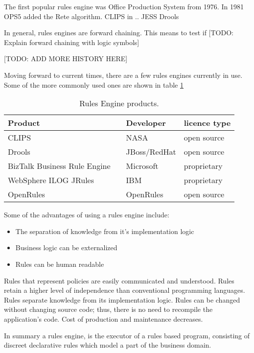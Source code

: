 The first popular rules engine was Office Production System from 1976. 
In 1981 OPS5 added the Rete algorithm.
CLIPS in  ..
JESS
Drools 



In general, rules engines are forward chaining.  This means to test if 
[TODO: Explain forward chaining with logic symbols] 

[TODO: ADD MORE HISTORY HERE]

Moving forward to current times, there are a few rules engines currently in use.
Some of the more commonly used ones are shown in table \ref{table:RuleEngines}

\begin{table}
    \begin{center}
        \begin{tabular}{ |l c |l|l| } 
            \hline
            Product                      &                             & Developer    & licence type   \\
            \hline
            CLIPS                        & \cite{CLIPSProductPage}     & NASA         & open source    \\ 
            Drools                       & \cite{DroolsProductPage}    & JBoss/RedHat & open source    \\ 
            BizTalk Business Rule Engine & \cite{BiztalkProductPage}   & Microsoft    & proprietary    \\ 
            WebSphere ILOG JRules        & \cite{JRulesProductPage}    & IBM          & proprietary    \\ 
            OpenRules                    & \cite{OpenRulesProductPage} & OpenRules    & open source    \\ 
            \hline
        \end{tabular}
    \end{center}
    \caption{Rules Engine products.}
    \label{table:RuleEngines}
\end{table}

Some of the advantages of using a rules engine include:
\begin{itemize}
    \item The separation of knowledge from it's implementation logic
    \item Business logic can be externalized
    \item Rules can be human readable
\end{itemize}

Rules that represent policies are easily
communicated and understood.
Rules retain a higher level of independence than
conventional programming languages.
Rules separate knowledge from its implementation
logic.
Rules can be changed without changing source
code; thus, there is no need to recompile the
application's code.
Cost of production and maintenance decreases. 


In summary a rules engine, is the executor of a rules based program, consisting of discreet declarative rules which model a part of the business domain.







